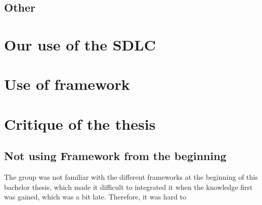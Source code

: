 \subsection{Other}

\section{Our use of the SDLC} %

\section{Use of framework} %

\section{Critique of the thesis}

\subsection{Not using Framework from the beginning}
The group was not familiar with the different frameworks at the beginning of this bachelor thesis, which made it difficult to integrated it when the knowledge first was gained, which was a bit late. Therefore, it was hard to 